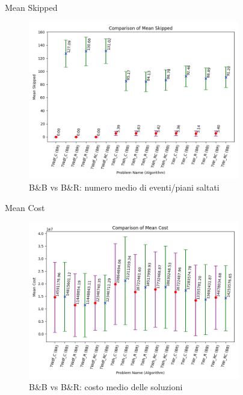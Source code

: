 \documentclass[10pt]{beamer}
\begin{document}
    \begin{frame}{Mean Skipped}
        \begin{figure}[h!]
            \centering
            \includegraphics[width=0.82\textwidth]{Images/mean_skipped.png}
            \caption{B\&B vs B\&R: numero medio di eventi/piani saltati}
            \label{fig:mean_skipped}
        \end{figure}
    \end{frame}

    \begin{frame}{Mean Cost}
        \begin{figure}[h!]
            \centering
            \includegraphics[width=0.82\textwidth]{Images/Mean_cost.png}
            \caption{B\&B vs B\&R: costo medio delle soluzioni}
            \label{fig:Mean_cost}
        \end{figure}
    \end{frame}
\end{document}
